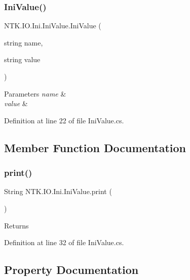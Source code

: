 \subsubsection{\texorpdfstring{IniValue()}{IniValue()}}
{\footnotesize\ttfamily N\+T\+K.\+I\+O.\+Ini.\+Ini\+Value.\+Ini\+Value (\begin{DoxyParamCaption}\item[{string}]{name,  }\item[{string}]{value }\end{DoxyParamCaption})}






\begin{DoxyParams}{Parameters}
{\em name} & \\
\hline
{\em value} & \\
\hline
\end{DoxyParams}


Definition at line 22 of file Ini\+Value.\+cs.



\subsection{Member Function Documentation}
\mbox{\label{class_n_t_k_1_1_i_o_1_1_ini_1_1_ini_value_ac063ebe81a3e39fe6f3412ce2b533db7}} 
\subsubsection{\texorpdfstring{print()}{print()}}
{\footnotesize\ttfamily String N\+T\+K.\+I\+O.\+Ini.\+Ini\+Value.\+print (\begin{DoxyParamCaption}{ }\end{DoxyParamCaption})}





\begin{DoxyReturn}{Returns}

\end{DoxyReturn}


Definition at line 32 of file Ini\+Value.\+cs.



\subsection{Property Documentation}
\mbox{\label{class_n_t_k_1_1_i_o_1_1_ini_1_1_ini_value_a20b705f1034c32d2ddf936040ec4845f}} 
